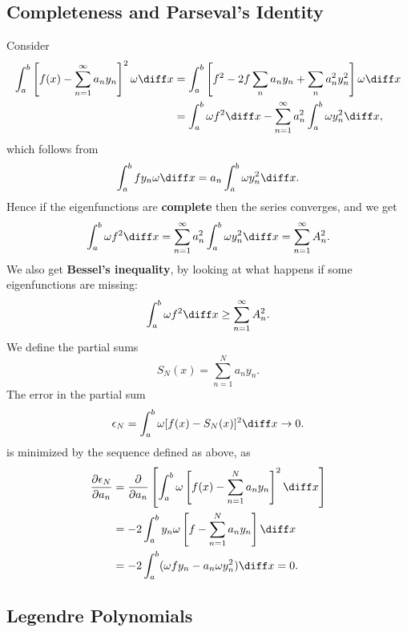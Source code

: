 \documentclass[12pt]{article}
\begin{document}
\subsection{Completeness and Parseval's Identity}%
\label{sub:completeness_and_parseval_s_identity}

Consider
\begin{align*}
	\int_{a}^{b}\left[ f(x) - \sum_{n = 1}^{\infty} a_n y_n \right]^2\omega \diff x &= \int_{a}^{b} \left[f^2 - 2f \sum_{n}a_n y_n + \sum_{n}a_n^2 y_n^2\right] \omega \diff x \\
											&= \int_{a}^{b}\omega f^2 \diff x - \sum_{n = 1}^{\infty}a_n^2 \int_{a}^{b}\omega y_n^2 \diff x,
\end{align*}
which follows from
\[
\int_{a}^{b} f y_n \omega \diff x = a_n \int_{a}^{b} \omega y_n^2 \diff x
.\]
Hence if the eigenfunctions are \textbf{complete} then the series converges, and we get
\[
\int_{a}^{b} \omega f^2 \diff x = \sum_{n = 1}^{\infty} a_n^2 \int_{a}^{b} \omega y_n^2 \diff x = \sum_{n = 1}^{\infty} A_n^2
.\]
We also get \textbf{Bessel's inequality}, by looking at what happens if some eigenfunctions are missing:
\[
\int_{a}^{b} \omega f^2 \diff x \geq \sum_{n = 1}^{\infty} A_n^2
.\]
We define the partial sums
\[
	S_N(x) = \sum_{n = 1}^{N}a_n y_n
.\]
The error in the partial sum
\[
	\epsilon_N = \int_{a}^{b} \omega[f(x) - S_N(x)]^2\diff x \to 0
.\]
is minimized by the sequence defined as above, as
\begin{align*}
	\frac{\partial \epsilon_N}{\partial a_n} &= \frac{\partial}{\partial a_n} \left[ \int_{a}^{b} \omega \left[f(x) - \sum_{n = 1}^{N}a_n y_n\right]^2 \diff x \right] \\
						 &= - 2 \int_{a}^{b} y_n \omega \left[f - \sum_{n = 1}^{N} a_n y_n\right]\diff x \\
						 &= -2 \int_{a}^{b}(\omega f y_n - a_n \omega y_n^2)\diff x = 0.
\end{align*}

\subsection{Legendre Polynomials}%
\label{sub:legendre_polynomials}
\end{document}
